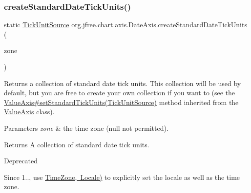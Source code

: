 \subsubsection{\texorpdfstring{create\+Standard\+Date\+Tick\+Units()}{createStandardDateTickUnits()}\hspace{0.1cm}{\footnotesize\ttfamily [3/3]}}
{\footnotesize\ttfamily static \mbox{\hyperlink{interfaceorg_1_1jfree_1_1chart_1_1axis_1_1_tick_unit_source}{Tick\+Unit\+Source}} org.\+jfree.\+chart.\+axis.\+Date\+Axis.\+create\+Standard\+Date\+Tick\+Units (\begin{DoxyParamCaption}\item[{Time\+Zone}]{zone }\end{DoxyParamCaption})\hspace{0.3cm}{\ttfamily [static]}}

Returns a collection of standard date tick units. This collection will be used by default, but you are free to create your own collection if you want to (see the \mbox{\hyperlink{classorg_1_1jfree_1_1chart_1_1axis_1_1_value_axis_ac84e1ffa28cdea7b355306ae472d21a2}{Value\+Axis\#set\+Standard\+Tick\+Units(\+Tick\+Unit\+Source)}} method inherited from the \mbox{\hyperlink{classorg_1_1jfree_1_1chart_1_1axis_1_1_value_axis}{Value\+Axis}} class).


\begin{DoxyParams}{Parameters}
{\em zone} & the time zone ({\ttfamily null} not permitted).\\
\hline
\end{DoxyParams}
\begin{DoxyReturn}{Returns}
A collection of standard date tick units.
\end{DoxyReturn}
\begin{DoxyRefDesc}{Deprecated}
\item[\mbox{\hyperlink{deprecated__deprecated000005}{Deprecated}}]Since 1.., use \mbox{\hyperlink{classorg_1_1jfree_1_1chart_1_1axis_1_1_date_axis_a5ebf7393323897c1e51fef720227afe6}{Time\+Zone, Locale)}} to explicitly set the locale as well as the time zone. \end{DoxyRefDesc}
\mbox{\label{classorg_1_1jfree_1_1chart_1_1axis_1_1_date_axis_ad529ca1a2a46fc687f9a8916fd4e7007}} 
